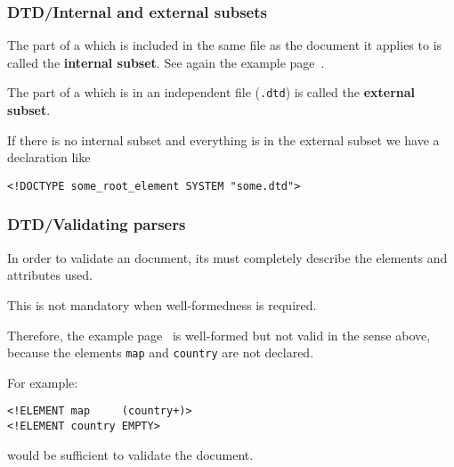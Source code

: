 %
\begin{frame}[containsverbatim]
\frametitle{DTD/Internal and external subsets}

The part of a \DTD which is included in the same file as the \XML
document it applies to is called the \textbf{internal subset}. See
again the example page~\pageref{xml_intro:id_idref}.

\bigskip

The part of a \DTD which is in an independent file (\texttt{.dtd}) is
called the \textbf{external subset}.

\bigskip

If there is no internal subset and everything is in the external
subset we have a declaration like
\begin{verbatim}
<!DOCTYPE some_root_element SYSTEM "some.dtd">
\end{verbatim}

\end{frame}

%
\begin{frame}[containsverbatim]
\frametitle{DTD/Validating parsers}

In order to validate an \XML document, its \DTD must completely
describe the elements and attributes used.

\bigskip

This is not mandatory when well-formedness is required.

\bigskip

Therefore, the example page~\pageref{xml_intro:id_idref} is
well-formed but not valid in the sense above, because the elements
\texttt{map} and \texttt{country} are not declared.

\bigskip

For example: 
\begin{verbatim}
<!ELEMENT map     (country+)>
<!ELEMENT country EMPTY>
\end{verbatim}
would be sufficient to validate the document.

\end{frame}

